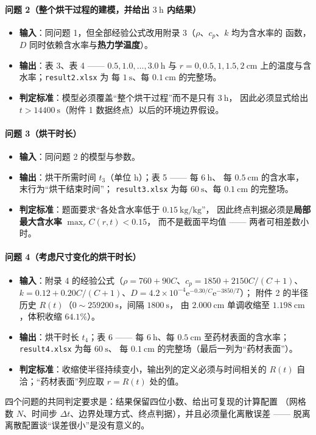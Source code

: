 \paragraph{问题 2（整个烘干过程的建模，并给出 $3\ \mathrm{h}$ 内结果）}
\begin{itemize}[leftmargin=2.2em,itemsep=0.15em]
  \item \textbf{输入}：同问题 1，但全部经验公式改用附录 3（$\rho$、$c_p$、$k$ 均为含水率的
        函数，$D$ 同时依赖含水率与\textbf{热力学温度}）。
  \item \textbf{输出}：表 3、表 4 —— $0.5,1.0,\dots,3.0\ \mathrm{h}$ 与
        $r=0,0.5,1,1.5,2\ \mathrm{cm}$ 上的温度与含水率；\texttt{result2.xlsx} 为
        每 $1\ \mathrm{s}$、每 $0.1\ \mathrm{cm}$ 的完整场。
  \item \textbf{判定标准}：模型必须覆盖“整个烘干过程”而不是只有 $3\ \mathrm{h}$，
        因此必须显式给出 $t>14400\ \mathrm{s}$（附件 1 数据终点）以后的环境边界假设。
\end{itemize}

\paragraph{问题 3（烘干时长）}
\begin{itemize}[leftmargin=2.2em,itemsep=0.15em]
  \item \textbf{输入}：同问题 2 的模型与参数。
  \item \textbf{输出}：烘干所需时间 $t_3$（单位 h）；表 5 —— 每 $6\ \mathrm{h}$、
        每 $0.5\ \mathrm{cm}$ 的含水率，末行为“烘干结束时间”；
        \texttt{result3.xlsx} 为每 $60\ \mathrm{s}$、每 $0.1\ \mathrm{cm}$ 的完整场。
  \item \textbf{判定标准}：题面要求“各处含水率低于 $0.15\ \mathrm{kg/kg}$”，
        因此终点判据必须是\textbf{局部最大含水率} $\max_r C(r,t)<0.15$，
        而不是截面平均值 —— 两者可相差数小时。
\end{itemize}

\paragraph{问题 4（考虑尺寸变化的烘干时长）}
\begin{itemize}[leftmargin=2.2em,itemsep=0.15em]
  \item \textbf{输入}：附录 4 的经验公式（$\rho=760+90C$、$c_p=1850+2150C/(C+1)$、
        $k=0.12+0.20C/(C+1)$、$D=4.2\times10^{-4}\mathrm{e}^{-0.30/C}\mathrm{e}^{-3850/T}$）；
        附件 2 的半径历史 $R(t)$（$0\sim259200\ \mathrm{s}$，间隔 $1800\ \mathrm{s}$，
        由 $2.000\ \mathrm{cm}$ 单调收缩至 $1.198\ \mathrm{cm}$，体积收缩 $64.1\%$）。
  \item \textbf{输出}：烘干时长 $t_4$；表 6 —— 每 $6\ \mathrm{h}$、每 $0.5\ \mathrm{cm}$
        至药材表面的含水率；\texttt{result4.xlsx} 为每 $60\ \mathrm{s}$、
        每 $0.1\ \mathrm{cm}$ 的完整场（最后一列为“药材表面”）。
  \item \textbf{判定标准}：收缩使半径持续变小，输出列的定义必须与时间相关的 $R(t)$
        自洽；“药材表面”列应取 $r=R(t)$ 处的值。
\end{itemize}

四个问题的共同判定要求是：结果保留四位小数、给出可复现的计算配置
（网格数 $N$、时间步 $\Delta t$、边界处理方式、终点判据），并且必须量化离散误差 ——
脱离离散配置谈“误差很小”是没有意义的。
